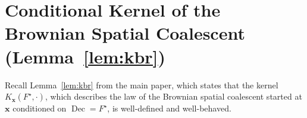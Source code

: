 \documentclass[reqno,draft]{amsart}
\numberwithin{equation}{section}
\theoremstyle{plain}
\newtheorem{lemma}[theorem]{Lemma}
\theoremstyle{remark}
\DeclareMathOperator{\pr}{pr}
\DeclareMathOperator{\lf}{lf}
\DeclareMathOperator{\nd}{nd}
\DeclareMathOperator{\dcb}{dec}
\newcommand{\kbr}{K} %
\DeclareMathOperator{\dc}{Dec}
\newcommand{\pth}{\mathrm{Path}}
\begin{document}
\section{Conditional Kernel of the Brownian Spatial Coalescent (Lemma~\ref{lem:kbr})}\label{sec:lemkbr}
Recall Lemma~\ref{lem:kbr} from the main paper, which states that the kernel $K_{\boldsymbol x}(F^\star,\cdot )$, which describes the law of the Brownian spatial coalescent started at $\boldsymbol x$ conditioned on $\dc = F^\star$, is well-defined and well-behaved.
\lemkbr*
\end{document}
